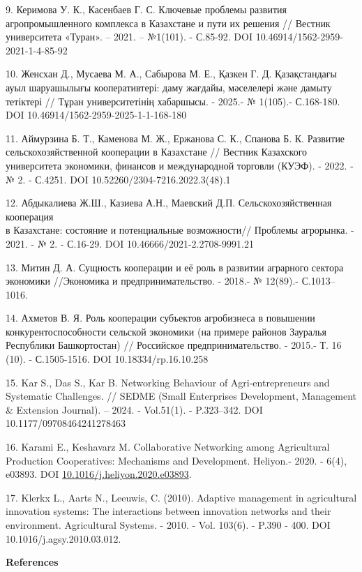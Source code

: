 \begin{references}
9. Керимова У. К., Касенбаев Г. С. Ключевые проблемы развития
агропромышленного комплекса в Казахстане и пути их решения // Вестник
университета «Туран». -- 2021. -- №1(101). - С.85-92. DOI
10.46914/1562-2959-2021-1-4-85-92

10. Женсхан Д., Мусаева М. А., Сабырова М. Е., Қазкен Г. Д.
Қазақстандағы ауыл шаруашылығы кооперативтері: даму жағдайы, мәселелері
және дамыту тетіктері // Тұран университетінің хабаршысы. - 2025.- №
1(105).- С.168-180. DOI 10.46914/1562-2959-2025-1-1-168-180

11. Аймурзина Б. Т., Каменова М. Ж., Ержанова С. К., Спанова Б. К.
Развитие сельскохозяйственной кооперации в Казахстане // Вестник
Казахского университета экономики, финансов и международной торговли
(КУЭФ). - 2022. - № 2. - С.4251. DOI 10.52260/2304-7216.2022.3(48).1

12. Абдыкалиева Ж.Ш., Казиева А.Н., Маевский Д.П. Сельскохозяйственная
кооперация\\
в Казахстане: состояние и потенциальные возможности// Проблемы
агрорынка. - 2021. - № 2. - С.16-29. DOI 10.46666/2021-2.2708-9991.21

13. Митин Д. А. Сущность кооперации и её роль в развитии аграрного
сектора экономики //Экономика и предпринимательство. - 2018.- № 12(89).-
С.1013--1016.

14. Ахметов В. Я. Роль кооперации субъектов агробизнеса в повышении
конкурентоспособности сельской экономики (на примере районов Зауралья
Республики Башкортостан) // Российское предпринимательство. - 2015.- Т.
16 (10). - С.1505-1516. DOI 10.18334/rp.16.10.258

15. Kar S., Das S., Kar B. Networking Behaviour of Agri-entrepreneurs
and Systematic Challenges. // SEDME (Small Enterprises Development,
Management \& Extension Journal). -- 2024. - Vol.51(1). - P.323--342.
DOI 10.1177/09708464241278463

16. Karami E., Keshavarz M. Collaborative Networking among Agricultural
Production Cooperatives: Mechanisms and Development. Heliyon.- 2020. -
6(4), e03893. DOI
\href{https://doi.org/10.1016/j.heliyon.2020.e03893}{10.1016/j.heliyon.2020.e03893}.

17. Klerkx L., Aarts N., Leeuwis, C. (2010). Adaptive management in
agricultural innovation systems: The interactions between innovation
networks and their environment. Agricultural Systems. - 2010. - Vol.
103(6). - P.390 - 400. DOI 10.1016/j.agsy.2010.03.012.
\end{references}

\begin{center}
{\bfseries References}
\end{center}

